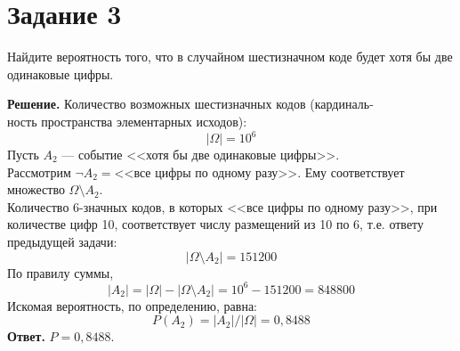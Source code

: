 \documentclass[a4paper,12pt]{article}
\begin{document}
\section*{Задание 3}
Найдите вероятность того, что в случайном шестизначном коде будет хотя бы две одинаковые цифры.\par
{\noindent \bf Решение.} Количество возможных шестизначных кодов (кардиналь-\\ность пространства элементарных исходов):
$$\vert\Omega|=10^6$$
Пусть $A_2$ --- событие <<хотя бы две одинаковые цифры>>. \\
Рассмотрим $\neg A_2=$<<все цифры по одному разу>>. Ему соответствует множество $\Omega\setminus A_2$. \\ Количество 6-значных кодов, в которых <<все цифры по одному разу>>, при количестве цифр 10, соответствует числу размещений из 10 по 6, т.е. ответу предыдущей задачи: 
$$|\Omega\setminus A_2|=151200$$
По правилу суммы, 
$$|A_2| = |\Omega| - |\Omega\setminus A_2| = 10^6 - 151200 = 848800$$
Искомая вероятность, по определению, равна:
$$P(A_2) = |A_2|/|\Omega|=0,8488$$
{\bf Ответ.} $P = 0,8488$.
\end{document}
